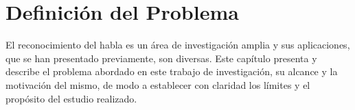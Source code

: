 \chapter{Definici\'on del Problema}
\label{sec:problema}

El reconocimiento del habla es un área de investigación amplia y sus aplicaciones, que se han presentado
previamente, son diversas. Este capítulo presenta y describe el problema abordado en este trabajo
de investigación, su alcance y la motivación del mismo, de modo a establecer con claridad los límites
y el propósito del estudio realizado.





